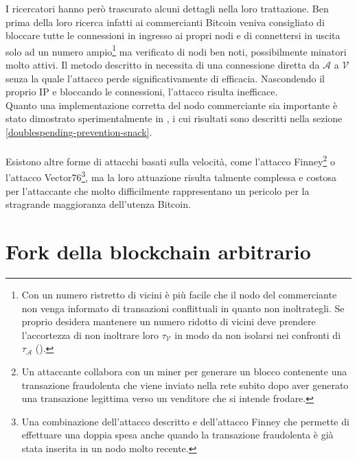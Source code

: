 I ricercatori hanno però trascurato alcuni dettagli nella loro trattazione. Ben prima della loro ricerca infatti ai commercianti Bitcoin veniva consigliato di bloccare tutte le connessioni in ingresso ai propri nodi e di connettersi in uscita solo ad un numero ampio\footnote{Con un numero ristretto di vicini è più facile che il nodo del commerciante non venga informato di transazioni conflittuali in quanto non inoltrategli. Se proprio desidera mantenere un numero ridotto di vicini deve prendere l'accortezza di non inoltrare loro $\tau_\mathcal{V}$ in modo da non isolarsi nei confronti di $\tau_\mathcal{A}$  (\cite{bitcoinsnack}).} ma verificato di nodi ben noti, possibilmente minatori molto attivi. Il metodo descritto in \cite{doublespendig_fast} necessita di una connessione diretta da $\mathcal{A}$ a $\mathcal{V}$ senza la quale l'attacco perde significativamente di efficacia. Nascondendo il proprio IP e bloccando le connessioni, l'attacco risulta inefficace. \\ Quanto una implementazione corretta del nodo commerciante sia importante è stato dimostrato sperimentalmente in \cite{bitcoinsnack}, i cui risultati sono descritti nella sezione \ref{doublespending-prevention-snack}.\\\\
Esistono altre forme di attacchi basati sulla velocità, come l'attacco Finney\footnote{Un attaccante collabora con un miner per generare un blocco contenente una transazione fraudolenta che viene inviato nella rete subito dopo aver generato una transazione legittima verso un venditore che si intende frodare.} o l'attacco Vector76\footnote{Una combinazione dell'attacco descritto e dell'attacco Finney che permette di effettuare una doppia spesa anche quando la transazione fraudolenta è già stata inserita in un nodo molto recente.}, ma la loro attuazione risulta talmente complessa e costosa per l'attaccante che molto difficilmente rappresentano un pericolo per la stragrande maggioranza dell'utenza Bitcoin.

\section{Fork della blockchain arbitrario}\label{attacchi-hashrate}

